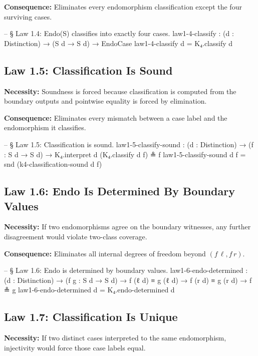\documentclass[11pt,a4paper]{book}
\begin{document}
\textbf{Consequence:} Eliminates every endomorphism classification except the four surviving cases.

\begin{code}
-- § Law 1.4: Endo(S) classifies into exactly four cases.
law1-4-classify : (d : Distinction) → (S d → S d) → EndoCase
law1-4-classify d = K₄.classify d
\end{code}

\subsection{Law 1.5: Classification Is Sound}

\textbf{Necessity:} Soundness is forced because classification is computed from the boundary outputs and pointwise equality is forced by elimination.

\textbf{Consequence:} Eliminates every mismatch between a case label and the endomorphism it classifies.

\begin{code}
-- § Law 1.5: Classification is sound.
law1-5-classify-sound : (d : Distinction) → (f : S d → S d) → K₄.interpret d (K₄.classify d f) ≗ f
law1-5-classify-sound d f = snd (k4-classification-sound d f)
\end{code}

\subsection{Law 1.6: Endo Is Determined By Boundary Values}

\textbf{Necessity:} If two endomorphisms agree on the boundary witnesses, any further disagreement would violate two-class coverage.

\textbf{Consequence:} Eliminates all internal degrees of freedom beyond $(f\, \ell, f\, r)$.

\begin{code}
-- § Law 1.6: Endo is determined by boundary values.
law1-6-endo-determined :
  (d : Distinction) →
  (f g : S d → S d) →
  f (ℓ d) ≡ g (ℓ d) →
  f (r d) ≡ g (r d) →
  f ≗ g
law1-6-endo-determined d = K₄.endo-determined d
\end{code}

\subsection{Law 1.7: Classification Is Unique}

\textbf{Necessity:} If two distinct cases interpreted to the same endomorphism, injectivity would force those case labels equal.
\end{document}
